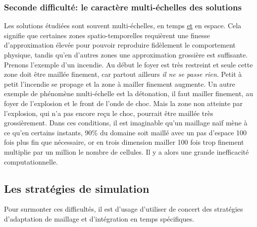     \subsubsection{Seconde difficulté: le caractère multi-échelles des solutions}
        Les solutions étudiées sont souvent multi-échelles, en temps \underline{et} en espace. Cela signifie que certaines zones spatio-temporelles requièrent
        une finesse d'approximation élevée pour pouvoir reproduire fidèlement le comportement physique, tandis qu'en d'autres zones une approximation
        grossière est suffisante. Prenons l'exemple d'un incendie. Au début le foyer est très restreint et seule cette zone doit être maillée finement, 
        car partout ailleurs \textit{il ne se passe rien}. Petit à petit l'incendie se propage et la zone à mailler finement augmente. Un autre exemple de phénomène 
        multi-échelle est la détonation, il faut mailler finement, au foyer de l'explosion et le front de l'onde de choc. Mais la zone non atteinte par l'explosion, 
        qui n'a pas encore reçu le choc, pourrait être maillée très grossièrement. 
        Dans ces conditions, il est imaginable qu'un maillage naïf mène à ce qu'en certains instants, 90\% du domaine soit maillé avec un pas d'espace 100 fois plus fin que nécessaire,
        or en trois dimension mailler 100 fois trop finement multiplie par un million le nombre de cellules.
        Il y a alors une grande inefficacité computationnelle.


\subsection{Les stratégies de simulation}
    Pour surmonter ces difficultés, il est d'usage d'utiliser de concert des stratégies d'adaptation de maillage et d'intégration en temps spécifiques. 
